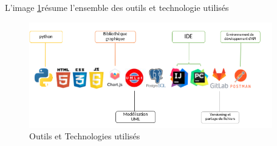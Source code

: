 L'image \ref{fig : Outils et Technologies utilisés}résume l’ensemble des outils et technologie utilisés 
\begin{figure}
\begin{center}
\includegraphics[width=400px]{images/logicielutilises.png}
\end{center}
\caption{Outils et Technologies utilisés}
\label{fig : Outils et Technologies utilisés}
\end{figure}
